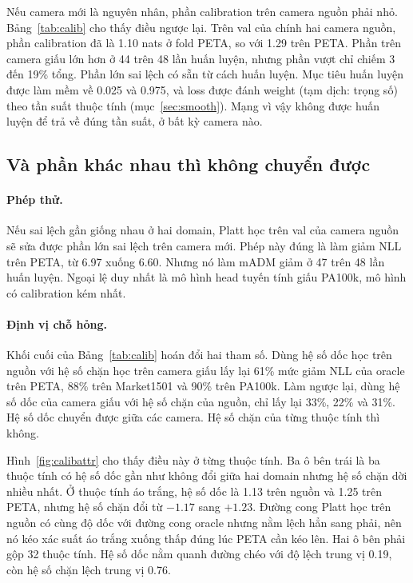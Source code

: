 \documentclass[11pt,a4paper]{article}
\begin{document}
Nếu camera mới là nguyên nhân, phần calibration trên camera nguồn phải nhỏ. Bảng~\ref{tab:calib} cho thấy điều ngược lại. Trên val của chính hai camera nguồn, phần calibration đã là 1.10 nats ở fold PETA, so với 1.29 trên PETA. Phần trên camera giấu lớn hơn ở 44 trên 48 lần huấn luyện, nhưng phần vượt chỉ chiếm 3 đến 19\% tổng. Phần lớn sai lệch có sẵn từ cách huấn luyện. Mục tiêu huấn luyện được làm mềm về 0.025 và 0.975, và loss được đánh weight (tạm dịch: trọng số) theo tần suất thuộc tính (mục~\ref{sec:smooth}). Mạng vì vậy không được huấn luyện để trả về đúng tần suất, ở bất kỳ camera nào.

\subsection{Và phần khác nhau thì không chuyển được}

\paragraph{Phép thử.} Nếu sai lệch gần giống nhau ở hai domain, Platt học trên val của camera nguồn sẽ sửa được phần lớn sai lệch trên camera mới. Phép này đúng là làm giảm NLL trên PETA, từ 6.97 xuống 6.60. Nhưng nó làm mADM giảm ở 47 trên 48 lần huấn luyện. Ngoại lệ duy nhất là mô hình head tuyến tính giấu PA100k, mô hình có calibration kém nhất.

\paragraph{Định vị chỗ hỏng.} Khối cuối của Bảng~\ref{tab:calib} hoán đổi hai tham số. Dùng hệ số dốc học trên nguồn với hệ số chặn học trên camera giấu lấy lại 61\% mức giảm NLL của oracle trên PETA, 88\% trên Market1501 và 90\% trên PA100k. Làm ngược lại, dùng hệ số dốc của camera giấu với hệ số chặn của nguồn, chỉ lấy lại 33\%, 22\% và 31\%. Hệ số dốc chuyển được giữa các camera. Hệ số chặn của từng thuộc tính thì không.

Hình~\ref{fig:calibattr} cho thấy điều này ở từng thuộc tính. Ba ô bên trái là ba thuộc tính có hệ số dốc gần như không đổi giữa hai domain nhưng hệ số chặn dời nhiều nhất. Ở thuộc tính áo trắng, hệ số dốc là 1.13 trên nguồn và 1.25 trên PETA, nhưng hệ số chặn đổi từ $-1.17$ sang $+1.23$. Đường cong Platt học trên nguồn có cùng độ dốc với đường cong oracle nhưng nằm lệch hẳn sang phải, nên nó kéo xác suất áo trắng xuống thấp đúng lúc PETA cần kéo lên. Hai ô bên phải gộp 32 thuộc tính. Hệ số dốc nằm quanh đường chéo với độ lệch trung vị 0.19, còn hệ số chặn lệch trung vị 0.76.
\end{document}
